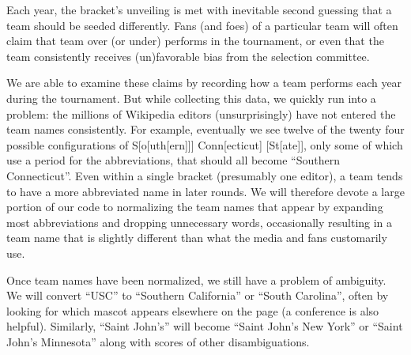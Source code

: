 \documentclass{article}
\begin{document}
Each year, the bracket's unveiling is met with inevitable second guessing that a team should be seeded differently.  Fans (and foes) of a particular team will often claim that team over (or under) performs in the tournament, or even that the team consistently receives (un)favorable bias from the selection committee.

We are able to examine these claims by recording how a team performs each year during the tournament.  But while collecting this data, we quickly run into a problem: the millions of Wikipedia editors (unsurprisingly) have not entered the team names consistently.  For example, eventually we see twelve of the twenty four possible configurations of S[o[uth[ern]]] Conn[ecticut] [St[ate]], only some of which use a period for the abbreviations, that should all become ``Southern Connecticut''.  Even within a single bracket (presumably one editor), a team tends to have a more abbreviated name in later rounds. We will therefore devote a large portion of our code to normalizing the team names that appear by expanding most abbreviations and dropping unnecessary words, occasionally resulting in a team name that is slightly different than what the media and fans customarily use.

Once team names have been normalized, we still have a problem of ambiguity.  We will convert ``USC'' to ``Southern California'' or ``South Carolina'', often by looking for which mascot appears elsewhere on the page (a conference is also helpful).  Similarly, ``Saint John's'' will become ``Saint John's New York'' or ``Saint John's Minnesota'' along with scores of other disambiguations.
\end{document}
